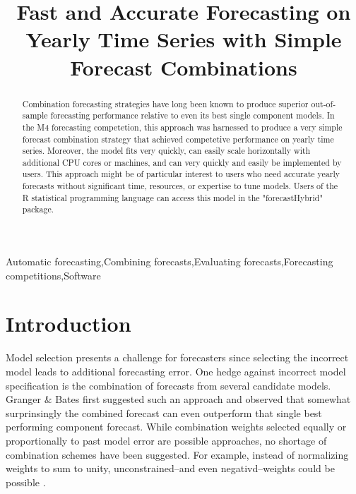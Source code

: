 \documentclass[11pt,3p,review,authoryear]{elsarticle}
\begin{document}
\begin{frontmatter}

\title{Fast and Accurate Forecasting on Yearly Time Series with Simple Forecast Combinations}





\begin{abstract}
Combination forecasting strategies have long been known to produce superior out-of-sample forecasting performance relative to even its best single component models. In the M4 forecasting competetion, this approach was harnessed to produce a very simple forecast combination strategy that achieved competetive performance on yearly time series. Moreover, the model fits very quickly, can easily scale horizontally with additional CPU cores or machines, and can very quickly and easily be implemented by users. This approach might be of particular interest to users who need accurate yearly forecasts without significant time, resources, or expertise to tune models. Users of the R statistical programming language can access this model in the "forecastHybrid" package.
\end{abstract}

\begin{keyword}
Automatic forecasting\sep Combining forecasts\sep Evaluating forecasts\sep Forecasting competitions\sep Software
\end{keyword}

\end{frontmatter}


\section{Introduction}
Model selection presents a challenge for forecasters since selecting the incorrect model leads to additional forecasting error. One hedge against incorrect model specification is the combination of forecasts from several candidate models. Granger \& Bates \cite{GrangerBates1964} first suggested such an approach and observed that somewhat surprinsingly the combined forecast can even outperform that single best performing component forecast. While combination weights selected equally or proportionally to past model error are possible approaches, no shortage of combination schemes have been suggested. For example, instead of normalizing weights to sum to unity, unconstrained--and even negativd--weights could be possible \citep{GrangerRamanathan1984}.
\end{document}
